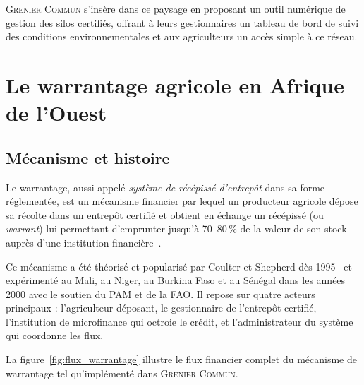 \documentclass[12pt,a4paper,twoside]{report}
\newcommand{\gc}{\textsc{Grenier Commun}}
\begin{document}
\gc{} s'insère dans ce paysage en proposant un outil numérique de gestion des
silos certifiés, offrant à leurs gestionnaires un tableau de bord de suivi des
conditions environnementales et aux agriculteurs un accès simple à ce réseau.

\section{Le warrantage agricole en Afrique de l'Ouest}

\subsection{Mécanisme et histoire}

Le warrantage, aussi appelé \emph{système de récépissé d'entrepôt} dans sa
forme réglementée, est un mécanisme financier par lequel un producteur agricole
dépose sa récolte dans un entrepôt certifié et obtient en échange un récépissé
(ou \emph{warrant}) lui permettant d'emprunter jusqu'à 70--80\,\% de la valeur
de son stock auprès d'une institution financière~\cite{wfp2010warrantage}.

Ce mécanisme a été théorisé et popularisé par Coulter et Shepherd dès
1995~\cite{coulter2009warrantage} et expérimenté au Mali, au Niger, au
Burkina Faso et au Sénégal dans les années 2000 avec le soutien du PAM et
de la FAO. Il repose sur quatre acteurs principaux : l'agriculteur déposant,
le gestionnaire de l'entrepôt certifié, l'institution de microfinance qui
octroie le crédit, et l'administrateur du système qui coordonne les flux.

La figure~\ref{fig:flux_warrantage} illustre le flux financier complet du
mécanisme de warrantage tel qu'implémenté dans \gc{}.
\end{document}
